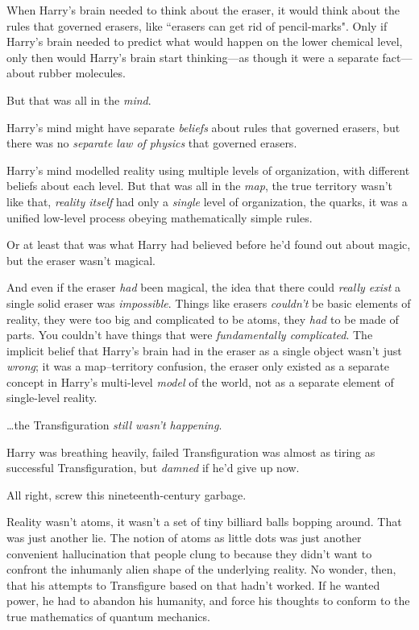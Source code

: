 When Harry's brain needed to think about the eraser, it would think about the rules that governed erasers, like ``erasers can get rid of pencil-marks". Only if Harry's brain needed to predict what would happen on the lower chemical level, only then would Harry's brain start thinking—as though it were a separate fact—about rubber molecules.

But that was all in the \emph{mind}.

Harry's mind might have separate \emph{beliefs} about rules that governed erasers, but there was no \emph{separate law of physics} that governed erasers.

Harry's mind modelled reality using multiple levels of organization, with different beliefs about each level. But that was all in the \emph{map}, the true territory wasn't like that, \emph{reality itself} had only a \emph{single} level of organization, the quarks, it was a unified low-level process obeying mathematically simple rules.

Or at least that was what Harry had believed before he'd found out about magic, but the eraser wasn't magical.

And even if the eraser \emph{had} been magical, the idea that there could \emph{really exist} a single solid eraser was \emph{impossible}. Things like erasers \emph{couldn't} be basic elements of reality, they were too big and complicated to be atoms, they \emph{had} to be made of parts. You couldn't have things that were \emph{fundamentally complicated}. The implicit belief that Harry's brain had in the eraser as a single object wasn't just \emph{wrong}; it was a map--territory confusion, the eraser only existed as a separate concept in Harry's multi-level \emph{model} of the world, not as a separate element of single-level reality.

{\ldots}the Transfiguration \emph{still wasn't happening}.

Harry was breathing heavily, failed Transfiguration was almost as tiring as successful Transfiguration, but \emph{damned} if he'd give up now.

All right, screw this nineteenth-century garbage.

Reality wasn't atoms, it wasn't a set of tiny billiard balls bopping around. That was just another lie. The notion of atoms as little dots was just another convenient hallucination that people clung to because they didn't want to confront the inhumanly alien shape of the underlying reality. No wonder, then, that his attempts to Transfigure based on that hadn't worked. If he wanted power, he had to abandon his humanity, and force his thoughts to conform to the true mathematics of quantum mechanics.

